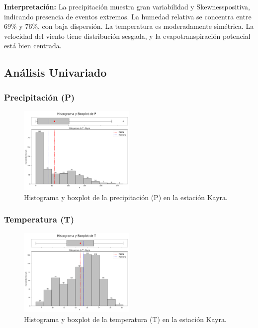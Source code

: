 \textbf{Interpretación:} La precipitación muestra gran variabilidad y Skewnesspositiva, indicando presencia de eventos extremos. La humedad relativa se concentra entre 69\% y 76\%, con baja dispersión. La temperatura es moderadamente simétrica. La velocidad del viento tiene distribución sesgada, y la evapotranspiración potencial está bien centrada.

\subsection{Análisis Univariado}

\subsubsection*{Precipitación (P)}
\begin{figure}[H]
\centering
\includegraphics[width=0.5\textwidth]{resultados/por_estacion_meteorologica/Kayra/P_histograma.png}
\caption{Histograma y boxplot de la precipitación (P) en la estación Kayra.}
\label{fig:kayra_P}
\end{figure}

\subsubsection*{Temperatura (T)}
\begin{figure}[H]
\centering
\includegraphics[width=0.5\textwidth]{resultados/por_estacion_meteorologica/Kayra/T_histograma.png}
\caption{Histograma y boxplot de la temperatura (T) en la estación Kayra.}
\label{fig:kayra_T}
\end{figure}

